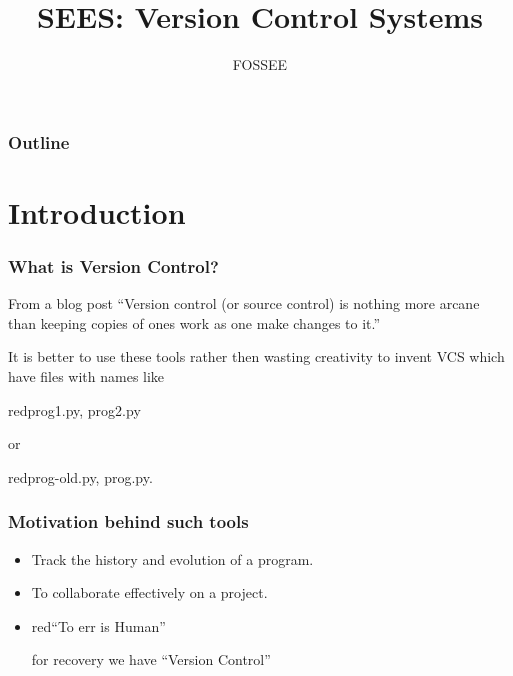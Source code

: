 \documentclass[14pt,compress]{beamer}
\title[Version Control Systems]{SEES: Version Control Systems}
\author[FOSSEE] {FOSSEE}
\institute[IIT Bombay] {Department of Aerospace Engineering\\IIT Bombay}
\date[]{}
\begin{document}
\begin{frame}
  \maketitle
\end{frame}

\begin{frame}
  \frametitle{Outline}
  \tableofcontents
\end{frame}


\section{Introduction}

\begin{frame}
  \frametitle{What is Version Control?}
  \begin{block}{From a blog post}
    ``Version control (or source control) is nothing more arcane than keeping copies of ones work as one make changes to it.''
  \end{block}
  \pause
  \begin{block}{}
    It is better to use these tools rather then wasting creativity to invent VCS which have files with names like \begin{color}{red}{prog1.py, prog2.py}\end{color} or \begin{color}{red}prog-old.py, prog.py.\end{color}
  \end{block}
\end{frame}

\begin{frame}
  \frametitle{Motivation behind such tools}
  \begin{itemize}
  \item Track the history and evolution of a program.
  \item To collaborate effectively on a project.
  \item \begin{color}{red}``To err is Human''\end{color} \pause for recovery we have ``Version Control''
  \end{itemize}
\end{frame}
\end{document}

